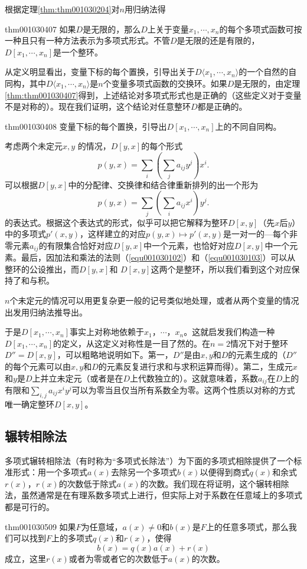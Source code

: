 根据定理\ref{thm:thm001030204}对$n$用归纳法得
\begin{theorem}{}{thm001030407}
如果$D$是无限的，那么$D$上关于变量$x_1,\cdots, x_n$的每个多项式函数可按一种且只有一种方法表示为多项式形式。不管$D$是无限的还是有限的，$D[x_1,\cdots,x_n]$是一个整环。
\end{theorem}

从定义明显看出，变量下标的每个置换，引导出关于$D\langle{x_1,\cdots,x_n}\rangle$的一个自然的自同构，其中$D\langle{x_1,\cdots, x_n}\rangle$是$n$个变量多项式函数的交换环。如果$D$是无限的，由定理\ref{thm:thm001030407}得到，上述结论对多项式形式也是正确的（这些定义对于变量不是对称的）。现在我们证明，这个结论对任意整环$D$都是正确的。
\begin{theorem}{}{thm001030408}
变量下标的每个置换，引导出$D[x_1,\cdots,x_n]$上的不同自同构。
\end{theorem}

考虑两个未定元$x, y$
的情况，$D[y, x]$的每个形式
\[
p(y, x) = \sum_{i}{(\sum_{j}{a_{ij}y^j})x^i}.
\]
可以根据$D[y,x]$中的分配律、交换律和结合律重新排列的出一个形为
\[
p(y, x) = \sum_{j}{(\sum_{i}{a_{ij}x^i})y^j}.
\]
的表达式。根据这个表达式的形式，似乎可以把它解释为整环$D[x, y]$（先$x$后$y$）中的多项式$p'(x, y)$，这样建立的对应$p(y, x) \mapsto p'(x, y)$是一对一的---每个非零元素$a_{ij}$的有限集合恰好对应$D[y, x]$中一个元素，也恰好对应$D[x, y]$中一个元素。最后，因加法和乘法的法则（\ref{equ001030102}）和（\ref{equ001030103}）可以从整环的公设推出，而$D[y, x]$和 $D[x, y]$这两个是整环，所以我们看到这个对应保持了和与积。

$n$个未定元的情况可以用更复杂更一般的记号类似地处理，或者从两个变量的情况出发用归纳法推导出。

于是$D[x_1, \cdots, x_n]$事实上对称地依赖于$x_1$，$\cdots$，$x_n$。这就启发我们构造一种$D[x_1, \cdots, x_n]$的定义，从这定义对称性是一目了然的。在$n=2$情况下对于整环$D''=D[x,y]$，可以粗略地说明如下。第一，$D''$是由$x, y$和$D$的元素生成的（$D''$的每个元素可以由$x, y$和$D$的元素反复进行求和与求积运算而得）。第二，生成元$x$和$y$是$D$上并立未定元（或者是在$D$上代数独立的）。这就意味着，系数$a_{ij}$在$D$上的有限和$\sum_{i,j}{a_{ij}x^iy^j}$可以为零当且仅当所有系数全为零。这两个性质以对称的方式唯一确定整环$D[x, y]$。


\subsection{辗转相除法}\label{subsection0010305}
多项式辗转相除法（有时称为“多项式长除法”）为下面的多项式相除提供了一个标准形式：用一个多项式$a(x)$去除另一个多项式$b(x)$以便得到商式$q(x)$和余式$r(x)$，$r(x)$的次数低于除式$a(x)$的次数。我们现在将证明，这个辗转相除法，虽然通常是在有理系数多项式上进行，但实际上对于系数在任意域上的多项式都是可行的。
\begin{theorem}{}{thm001030509}
如果$F$为任意域，$a(x) \neq 0$和$b(x)$是$F$上的任意多项式，那么我们可以找到$F$上的多项式$q(x)$和$r(x)$，使得
\begin{equation}\label{equ001030508}
b(x)=q(x)a(x)+r(x)
\end{equation}
成立，这里$r(x)$或者为零或者它的次数低于$a(x)$的次数。
\end{theorem}

